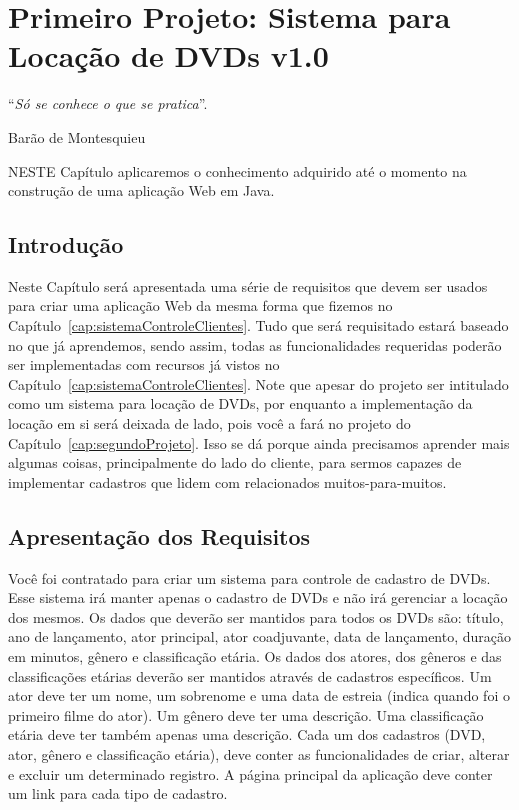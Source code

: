 \chapter{Primeiro Projeto: Sistema para Locação de DVDs v1.0}\label{cap:primeiroProjeto}
\epigraph{``\textit{Só se conhece o que se pratica}''.}{Barão de Montesquieu}

\lettrine[lines=4, lhang=0.1, lraise=0, loversize=0.2, findent=0.1em]{\textcolor{corTema}{N}}{ESTE} Capítulo aplicaremos o conhecimento adquirido até o momento na construção de uma aplicação Web em Java.


\section{Introdução}

Neste Capítulo será apresentada uma série de requisitos que devem ser usados para criar uma aplicação Web da mesma forma que fizemos no Capítulo~\ref{cap:sistemaControleClientes}. Tudo que será requisitado estará baseado no que já aprendemos, sendo assim, todas as funcionalidades requeridas poderão ser implementadas com recursos já vistos no Capítulo~\ref{cap:sistemaControleClientes}. Note que apesar do projeto ser intitulado como um sistema para locação de DVDs, por enquanto a implementação da locação em si será deixada de lado, pois você a fará no projeto do Capítulo~\ref{cap:segundoProjeto}. Isso se dá porque ainda precisamos aprender mais algumas coisas, principalmente do lado do cliente, para sermos capazes de implementar cadastros que lidem com relacionados muitos-para-muitos.


\section{Apresentação dos Requisitos}

Você foi contratado para criar um sistema para controle de cadastro de DVDs. Esse sistema irá manter apenas o cadastro de DVDs e não irá gerenciar a locação dos mesmos. Os dados que deverão ser mantidos para todos os DVDs são: título, ano de lançamento, ator principal, ator coadjuvante, data de lançamento, duração em minutos, gênero e classificação etária. Os dados dos atores, dos gêneros e das classificações etárias deverão ser mantidos através de cadastros específicos. Um ator deve ter um nome, um sobrenome e uma data de estreia (indica quando foi o primeiro filme do ator). Um gênero deve ter uma descrição. Uma classificação etária deve ter também apenas uma descrição. Cada um dos cadastros (DVD, ator, gênero e classificação etária), deve conter as funcionalidades de criar, alterar e excluir um determinado registro. A página principal da aplicação deve conter um link para cada tipo de cadastro.


